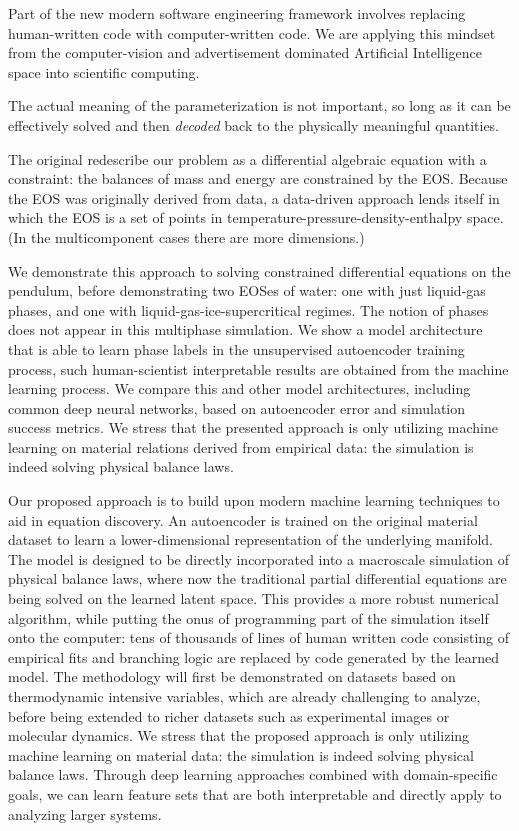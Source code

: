 \documentclass[]{article}
\begin{document}
Part of the new modern software engineering framework involves replacing
human-written code with computer-written code. We are applying this
mindset from the computer-vision and advertisement dominated Artificial
Intelligence space into scientific computing.

The actual meaning of the parameterization is not important, so long as
it can be effectively solved and then \emph{decoded} back to the
physically meaningful quantities.

The original redescribe our problem as a differential algebraic equation
with a constraint: the balances of mass and energy are constrained by
the EOS. Because the EOS was originally derived from data, a data-driven
approach lends itself in which the EOS is a set of points in
temperature-pressure-density-enthalpy space. (In the multicomponent
cases there are more dimensions.)

We demonstrate this approach to solving constrained differential
equations on the pendulum, before demonstrating two EOSes of water: one
with just liquid-gas phases, and one with liquid-gas-ice-supercritical
regimes. The notion of phases does not appear in this multiphase
simulation. We show a model architecture that is able to learn phase
labels in the unsupervised autoencoder training process, such
human-scientist interpretable results are obtained from the machine
learning process. We compare this and other model architectures,
including common deep neural networks, based on autoencoder error and
simulation success metrics. We stress that the presented approach is
only utilizing machine learning on material relations derived from
empirical data: the simulation is indeed solving physical balance laws.

Our proposed approach is to build upon modern machine learning
techniques to aid in equation discovery. An autoencoder is trained on
the original material dataset to learn a lower-dimensional
representation of the underlying manifold. The model is designed to be
directly incorporated into a macroscale simulation of physical balance
laws, where now the traditional partial differential equations are being
solved on the learned latent space. This provides a more robust
numerical algorithm, while putting the onus of programming part of the
simulation itself onto the computer: tens of thousands of lines of human
written code consisting of empirical fits and branching logic are
replaced by code generated by the learned model. The methodology will
first be demonstrated on datasets based on thermodynamic intensive
variables, which are already challenging to analyze, before being
extended to richer datasets such as experimental images or molecular
dynamics. We stress that the proposed approach is only utilizing machine
learning on material data: the simulation is indeed solving physical
balance laws. Through deep learning approaches combined with
domain-specific goals, we can learn feature sets that are both
interpretable and directly apply to analyzing larger systems.
\end{document}
